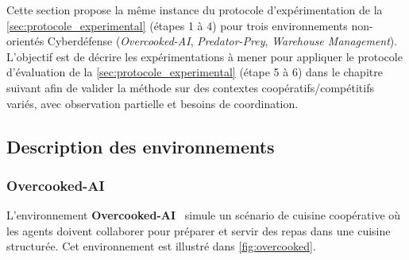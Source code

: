 Cette section propose la même instance du protocole d'expérimentation de la \autoref{sec:protocole_experimental} (étapes 1 à 4) pour trois environnements non-orientés Cyberdéfense (\textit{Overcooked-AI}, \textit{Predator-Prey}, \textit{Warehouse Management}).
L'objectif est de décrire les expérimentations à mener pour appliquer le protocole d'évaluation de la \autoref{sec:protocole_experimental} (étape 5 à 6) dans le chapitre suivant afin de valider la méthode  sur des contextes coopératifs/compétitifs variés, avec observation partielle et besoins de coordination.


\subsection{Description des environnements}

\subsubsection*{Overcooked-AI}

L'environnement \textbf{Overcooked-AI}~\cite{Carroll2019} simule un scénario de cuisine coopérative où les agents doivent collaborer pour préparer et servir des repas dans une cuisine structurée. Cet environnement est illustré dans \autoref{fig:overcooked}.

